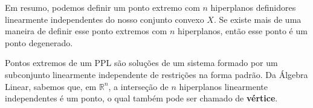 Em resumo, podemos definir um ponto extremo com $n$ hiperplanos definidores
linearmente independentes do nosso conjunto convexo $X$. Se existe mais de uma
maneira de definir esse ponto extremos com $n$ hiperplanos, então esse ponto é
um ponto degenerado.


Pontos extremos de um PPL são soluções de um sistema formado por um subconjunto linearmente
independente de restrições na forma padrão. Da Álgebra Linear, sabemos que, em
$\mathbb{R}^n$, a interseção de $n$ hiperplanos linearmente independentes é um ponto,
o qual também pode ser chamado de \textbf{vértice}.

